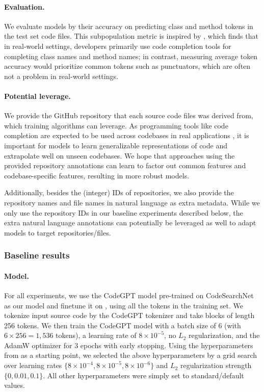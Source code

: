 \paragraph{Evaluation.}
We evaluate models by their accuracy on predicting class and method tokens in the test set code files. This subpopulation metric is inspired by \citet{hellendoorn2019code}, which finds that in real-world settings, developers primarily use code completion tools for completing class names and method names;
in contrast, measuring average token accuracy would prioritize common tokens such as punctuators, which are often not a problem in real-world settings.

\paragraph{Potential leverage.} We provide the GitHub repository that each source code files was derived from, which training algorithms can leverage.
As programming tools like code completion are expected to be used across codebases in real applications \citep{nita2010using,allamanis2017smartpaste}, it is important for models to learn generalizable representations of code and extrapolate well on unseen codebases.
We hope that approaches using the provided repository annotations can learn to factor out common features and codebase-specific features, resulting in more robust models.

Additionally, besides the (integer) IDs of repositories, we also provide the repository names and file names in natural language as extra metadata. While we only use the repository IDs in our baseline experiments described below, the extra natural language annotations can potentially be leveraged as well to adapt models to target repositories/files.


\subsubsection{Baseline results}
\label{sec:dataset_py150_result}

\paragraph{Model.} For all experiments, we use the CodeGPT model \citep{CodeXGLUE} pre-trained on CodeSearchNet \citep{husain2019codesearchnet} as our model and finetune it on \Py, using all the tokens in the training set.
We tokenize input source code by the CodeGPT tokenizer and take blocks of length 256 tokens.
We then train the CodeGPT model with a batch size of 6 (with $6 \times 256 = 1,536$ tokens), a learning rate of $8 \times 10^{-5}$, no $L_2$ regularization, and the AdamW optimizer \citep{loshchilov2019decoupled} for 3 epochs with early stopping.
Using the hyperparameters from \citet{CodeXGLUE} as a starting point, we selected the above hyperparameters by a grid search over learning rates $\{8 \times 10^{-4}, 8 \times 10^{-5}, 8 \times 10^{-6} \}$ and $L_2$ regularization strength $\{ 0, 0.01, 0.1 \}$. All other hyperparameters were simply set to standard/default values.

